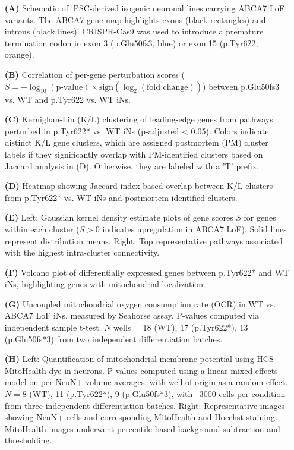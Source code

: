 \begin{itemize}
\item[\textbf{(A)}] Schematic of iPSC-derived isogenic neuronal lines carrying ABCA7 LoF variants. The ABCA7 gene map highlights exons (black rectangles) and introns (black lines). CRISPR-Cas9 was used to introduce a premature termination codon in exon 3 (p.Glu50fs3, blue) or exon 15 (p.Tyr622, orange).\\
\item[\textbf{(B)}] Correlation of per-gene perturbation scores ($S = -\log_{10}(\text{p-value}) \times \text{sign}(\log_2(\text{fold change}))$) between p.Glu50fs3 vs. WT and p.Tyr622 vs. WT iNs.\\
\item[\textbf{(C)}] Kernighan-Lin (K/L) clustering of leading-edge genes from pathways perturbed in p.Tyr622* vs. WT iNs (p-adjusted < 0.05). Colors indicate distinct K/L gene clusters, which are assigned postmortem (PM) cluster labels if they significantly overlap with PM-identified clusters based on Jaccard analysis in (D). Otherwise, they are labeled with a 'T' prefix.\\
\item[\textbf{(D)}] Heatmap showing Jaccard index-based overlap between K/L clusters from p.Tyr622* vs. WT iNs and postmortem-identified clusters.\\
\item[\textbf{(E)}] Left: Gaussian kernel density estimate plots of gene scores $S$ for genes within each cluster ($S>0$ indicates upregulation in ABCA7 LoF). Solid lines represent distribution means. Right: Top representative pathways associated with the highest intra-cluster connectivity.\\
\item[\textbf{(F)}] Volcano plot of differentially expressed genes between p.Tyr622* and WT iNs, highlighting genes with mitochondrial localization.\\
\item[\textbf{(G)}] Uncoupled mitochondrial oxygen consumption rate (OCR) in WT vs. ABCA7 LoF iNs, measured by Seahorse assay. P-values computed via independent sample t-test. $N$ wells = 18 (WT), 17 (p.Tyr622*), 13 (p.Glu50fs*3) from two independent differentiation batches.\\
\item[\textbf{(H)}] Left: Quantification of mitochondrial membrane potential using HCS MitoHealth dye in neurons. P-values computed using a linear mixed-effects model on per-NeuN+ volume averages, with well-of-origin as a random effect. $N=8$ (WT), 11 (p.Tyr622*), 9 (p.Glu50fs*3), with ~3000 cells per condition from three independent differentiation batches. Right: Representative images showing NeuN+ cells and corresponding MitoHealth and Hoechst staining. MitoHealth images underwent percentile-based background subtraction and thresholding.\\

\end{itemize}
